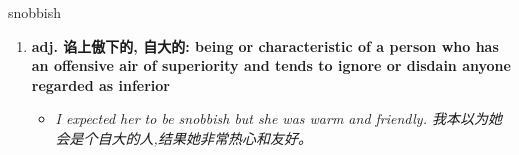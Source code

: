
\begin{frame}
{\huge snobbish}
\begin{center}
\begin{enumerate}\Large
  \item \textbf{adj. 谄上傲下的, 自大的: being or characteristic of a person who has an offensive air of superiority and tends to ignore or disdain anyone regarded as inferior}
  \begin{itemize}
    \item \em{\Large{I expected her to be snobbish but she was warm and friendly. 我本以为她会是个自大的人,结果她非常热心和友好。}}
  \end{itemize}
\end{enumerate}
\end{center}
\end{frame}
